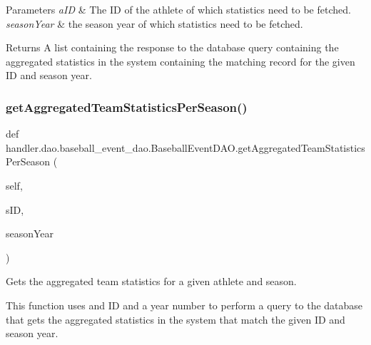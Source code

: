 \begin{DoxyParams}{Parameters}
{\em a\+ID} & The ID of the athlete of which statistics need to be fetched. \\
\hline
{\em season\+Year} & the season year of which statistics need to be fetched.\\
\hline
\end{DoxyParams}
\begin{DoxyReturn}{Returns}
A list containing the response to the database query containing the aggregated statistics in the system containing the matching record for the given ID and season year. 
\end{DoxyReturn}
\mbox{\label{classhandler_1_1dao_1_1baseball__event__dao_1_1_baseball_event_d_a_o_aa157f9e261a9f259673833c0cf35a012}} 
\subsubsection{\texorpdfstring{get\+Aggregated\+Team\+Statistics\+Per\+Season()}{getAggregatedTeamStatisticsPerSeason()}}
{\footnotesize\ttfamily def handler.\+dao.\+baseball\+\_\+event\+\_\+dao.\+Baseball\+Event\+D\+A\+O.\+get\+Aggregated\+Team\+Statistics\+Per\+Season (\begin{DoxyParamCaption}\item[{}]{self,  }\item[{}]{s\+ID,  }\item[{}]{season\+Year }\end{DoxyParamCaption})}



Gets the aggregated team statistics for a given athlete and season. 

This function uses and ID and a year number to perform a query to the database that gets the aggregated statistics in the system that match the given ID and season year.


